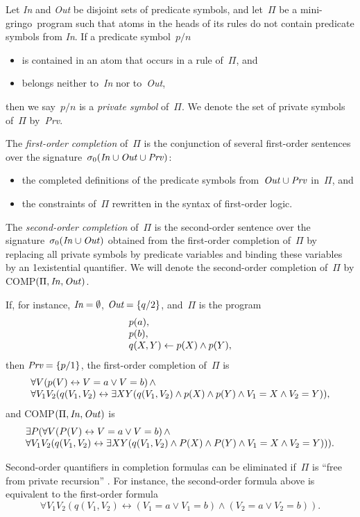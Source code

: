 \documentclass{article}
\def\ar{\leftarrow}
\def\lrar{\leftrightarrow}
\def\ba{\begin{array}}
\def\ea{\end{array}}
\def\gringo{{\sc gringo}}
\begin{document}
Let \emph{In} and \emph{Out} be disjoint sets of predicate symbols, and
let~$\Pi$ be a mini-\gringo\ program such that atoms in the heads of
its rules do not contain predicate symbols from \emph{In}.
If a predicate symbol~$p/n$
\begin{itemize}
\item is contained in an atom that occurs in a rule of~$\Pi$, and
\item belongs neither to~\emph{In} nor to~\emph{Out},
\end{itemize}
then we say~$p/n$ is a \emph{private symbol} of~$\Pi$.  We denote the
set of private symbols of~$\Pi$ by~\emph{Prv}.

The \emph{first-order completion} of~$\Pi$ is the conjunction of several
first-order sentences over the
signature~$\sigma_0(\emph{In\/}\cup\emph{Out\/}\cup\emph{Prv\/})$:
\begin{itemize}
\item the completed definitions of the predicate symbols
  from~$\emph{Out\/}\cup\emph{Prv\/}$ in~$\Pi$, and
\item the constraints of~$\Pi$ rewritten in the syntax of first-order
  logic.
\end{itemize}
The \emph{second-order completion} of~$\Pi$ is the second-order sentence
over the signature~$\sigma_0(\emph{In\/}\cup\emph{Out\/})$ obtained from
the first-order completion of~$\Pi$ by replacing all private symbols by
predicate variables and binding these variables by an 1existential quantifier.
We will denote the second-order completion of~$\Pi$ by
COMP$(\Pi,\emph{In\/},\emph{Out\/})$.

If, for instance, $\emph{In}=\emptyset$, $\emph{Out}=\{q/2\}$, and~$\Pi$
is the program
$$
\ba l
p(a),\\
p(b),\\
q(X,Y) \ar p(X) \land p(Y),
\ea$$
then $\emph{Prv}=\{p/1\}$,
the first-order completion of~$\Pi$ is
$$\ba l
\forall V(p(V) \lrar V=a \lor V=b)\,\land\\
\forall V_1V_2(q(V_1,V_2) \lrar \exists XY(q(V_1,V_2) \land p(X) \land p(Y)
\land V_1=X \land V_2=Y)),
\ea$$
and COMP$(\Pi,\emph{In\/},\emph{Out\/})$ is
$$
\ba l
\exists P(\forall V(P(V) \lrar V=a \lor V=b)\,\land\\
\forall V_1V_2(q(V_1,V_2) \lrar \exists XY(q(V_1,V_2) \land
P(X) \land P(Y) \land V_1=X \land V_2=Y))).
\ea
$$

Second-order quantifiers in completion formulas can be eliminated if~$\Pi$
is ``free from private recursion''
\cite[Section~6.4]{fan20}.  For instance, the second-order formula above
is equivalent to the first-order formula
$$
\forall V_1V_2(q(V_1,V_2) \lrar (V_1=a \lor V_1=b)\land(V_2=a \lor V_2=b)).
$$
\end{document}
